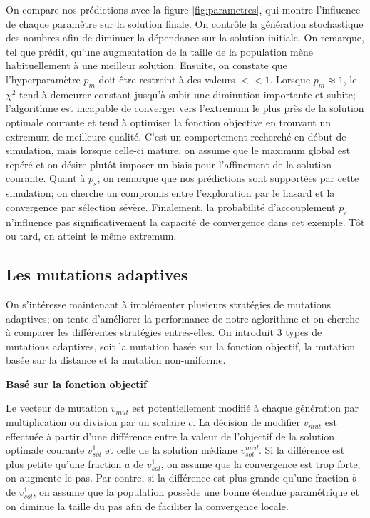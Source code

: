 \documentclass{article}
\begin{document}
On compare nos prédictions avec la figure \ref{fig:parametres}, qui montre l'influence de chaque paramètre sur la solution finale. On contrôle la génération stochastique des nombres afin de diminuer la dépendance sur la solution initiale. On remarque, tel que prédit, qu'une augmentation de la taille de la population mène habituellement à une meilleur solution. Ensuite, on constate que l'hyperparamètre $p_m$ doit être restreint à des valeurs $<<1$. Lorsque $p_m \approx 1$, le $\chi^2$ tend à demeurer constant jusqu'à subir une diminution importante et subite; l'algorithme est incapable de converger vers l'extremum le plus près de la solution optimale courante et tend à optimiser la fonction objective en trouvant un extremum de meilleure qualité. C'est un comportement recherché en début de simulation, mais lorsque celle-ci mature, on assume que le maximum global est repéré et on désire plutôt imposer un biais pour l'affinement de la solution courante. Quant à $p_s$, on remarque que nos prédictions sont supportées par cette simulation; on cherche un compromis entre l'exploration par le hasard et la convergence par sélection sévère. Finalement, la probabilité d'accouplement $p_c$ n'influence pas significativement la capacité de convergence dans cet exemple. Tôt ou tard, on atteint le même extremum. 


\subsection{Les mutations adaptives}\label{sec:mutations_adaptives}

On s'intéresse maintenant à implémenter plusieurs stratégies de mutations adaptives; on tente d'améliorer la performance de notre aglorithme et on cherche à comparer les différentes stratégies entres-elles. On introduit $3$ types de mutations adaptives, soit la mutation basée sur la fonction objectif, la mutation basée sur la distance et la mutation non-uniforme.

\vspace{0.3cm}
\noindent\textbf{Basé sur la fonction objectif}

Le vecteur de mutation $v_{mut}$ est potentiellement modifié à chaque génération par multiplication ou division par un scalaire $c$. La décision de modifier $v_{mut}$ est effectuée à partir d'une différence entre la valeur de l'objectif de la  solution optimale courante $v^1_{sol}$ et celle de la solution médiane $v^{med}_{sol}$. Si la différence est plus petite qu'une fraction $a$ de $v^1_{sol}$, on assume que la convergence est trop forte; on augmente le pas. Par contre, si la différence est plus grande qu'une fraction $b$ de $v^1_{sol}$, on assume que la population possède une bonne étendue paramétrique et on diminue la taille du pas afin de faciliter la convergence locale.
\end{document}
